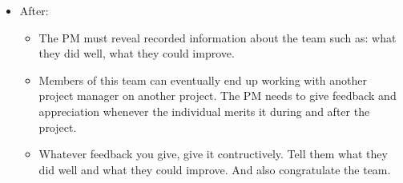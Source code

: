 \begin{itemize}
    \item After:
        \begin{itemize}
            \item The PM must reveal recorded information about the team such as: what they did well, what they could improve.
            \item Members of this team can eventually end up working with another project manager on another project. The PM needs to give feedback and appreciation whenever the individual merits it during and after the project.
            \item Whatever feedback you give, give it contructively. Tell them what they did well and what they could improve. And also congratulate the team.
        \end{itemize}
\end{itemize}
